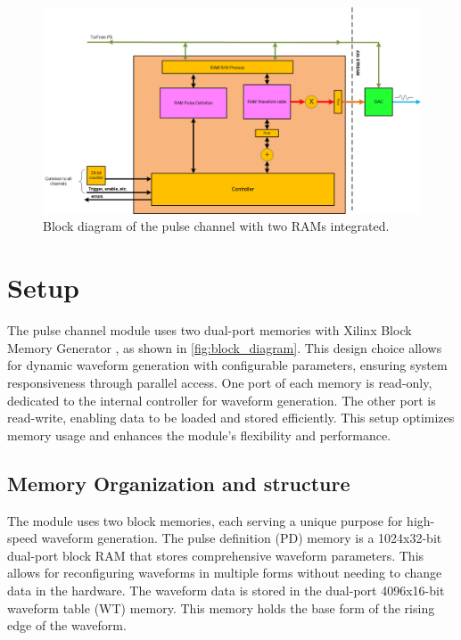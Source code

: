 \begin{figure}[h]
    \centering
    \includegraphics[width=1.0\linewidth]{figures/3.1.png}
    \caption{Block diagram of the pulse channel with two RAMs integrated.}
    \label{fig:block_diagram}
\end{figure}

\section{Setup}

The pulse channel module uses two dual-port memories with Xilinx Block Memory Generator \cite{blockmemgen}, as shown in \autoref{fig:block_diagram}. This design choice allows for dynamic waveform generation with configurable parameters, ensuring system responsiveness through parallel access. One port of each memory is read-only, dedicated to the internal controller for waveform generation. The other port is read-write, enabling data to be loaded and stored efficiently. This setup optimizes memory usage and enhances the module's flexibility and performance.

\subsection{Memory Organization and structure}

The module uses two block memories, each serving a unique purpose for high-speed waveform generation. The pulse definition (PD) memory is a 1024x32-bit dual-port block RAM that stores comprehensive waveform parameters. This allows for reconfiguring waveforms in multiple forms without needing to change data in the hardware. The waveform data is stored in the dual-port 4096x16-bit waveform table (WT) memory. This memory holds the base form of the rising edge of the waveform.

